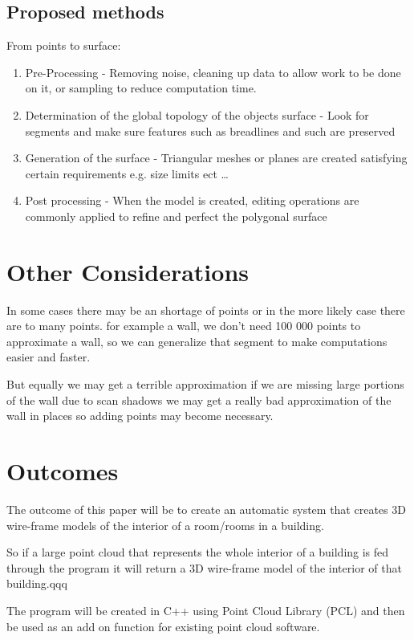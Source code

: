 \subsection{Proposed methods}


From points to surface:

\begin{enumerate}
	\item Pre-Processing - Removing noise, cleaning up data to allow work to be done on it, or sampling to reduce computation time.
	
	\item Determination of the global topology of the objects surface - Look for segments and make sure features such as breadlines and such are preserved
	
	\item Generation of the surface - Triangular meshes or planes are created satisfying certain requirements e.g. size limits ect \ldots
	
	\item Post processing - When the model is created, editing operations are commonly applied to refine and perfect the polygonal surface
\end{enumerate}

\section{Other Considerations}

In some cases there may be an shortage of points or in the more likely case there are to many points. for example a wall, we don't need 100 000 points to approximate a wall, so we can generalize that segment to make computations easier and faster.

But equally we may get a terrible approximation if we are missing large portions of the wall due to scan shadows we may get a really bad approximation of the wall in places so adding points may become necessary.



\section{Outcomes}

The outcome of this paper will be to create an automatic system that creates 3D wire-frame models of the interior of a room/rooms in a building. 

So if a large point cloud that represents the whole interior of a building is fed through the program it will return a 3D wire-frame model of the interior of that building.qqq

The program will be created in C++ using Point Cloud Library (PCL) and then be used as an add on function for existing point cloud software.







